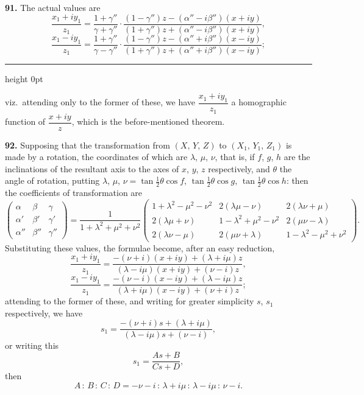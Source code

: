 \documentclass[11pt,a4paper]{article}
\newcommand{\artno}[1]{\textbf{#1.}\quad}
\begin{document}
\artno{91} The actual values are
\[
  \frac{x_{1} + i y_{1}}{z_{1}}
   = \frac{1 + \gamma''}{\gamma + \gamma''}\cdot
     \frac{(1 - \gamma'')z - (\alpha'' - i\beta'')(x + iy)}
          {(1 + \gamma'')z + (\alpha'' - i\beta'')(x + iy)},
\]
\[
  \frac{x_{1} - i y_{1}}{z_{1}}
   = \frac{1 + \gamma''}{\gamma - \gamma''}\cdot
     \frac{(1 - \gamma'')z - (\alpha'' + i\beta'')(x - iy)}
          {(1 + \gamma'')z + (\alpha'' + i\beta'')(x - iy)};
\]

\bigskip
\hrule height 0pt
\bigskip

\noindent
viz.\ attending only to the former of these, we have
$\dfrac{x_{1} + iy_{1}}{z_{1}}$ a homographic function of $\dfrac{x + iy}{z}$,
which is the before-mentioned theorem.

\artno{92} Supposing that the transformation from $(X,\,Y,\,Z)$ to
$(X_{1},\,Y_{1},\,Z_{1})$ is made by a rotation, the coordinates of which are
$\lambda$, $\mu$, $\nu$, that is, if $f$, $g$, $h$ are the inclinations of
the resultant axis to the axes of $x$, $y$, $z$ respectively, and $\theta$
the angle of rotation, putting $\lambda$, $\mu$, $\nu = \tan\tfrac{1}{2}\theta\cos f$,
$\tan\tfrac{1}{2}\theta\cos g$, $\tan\tfrac{1}{2}\theta\cos h$: then the
coefficients of transformation are
\[
  \begin{pmatrix} \alpha & \beta & \gamma\\
    \alpha' & \beta' & \gamma'\\
    \alpha'' & \beta'' & \gamma''
  \end{pmatrix}
  = \frac{1}{1 + \lambda^{2} + \mu^{2} + \nu^{2}}
    \begin{pmatrix}
      1 + \lambda^{2} - \mu^{2} - \nu^{2} & 2(\lambda\mu - \nu) & 2(\lambda\nu + \mu)\\
      2(\lambda\mu + \nu) & 1 - \lambda^{2} + \mu^{2} - \nu^{2} & 2(\mu\nu - \lambda)\\
      2(\lambda\nu - \mu) & 2(\mu\nu + \lambda) & 1 - \lambda^{2} - \mu^{2} + \nu^{2}
    \end{pmatrix}.
\]
Substituting these values, the formulae become, after an easy reduction,
\[
  \frac{x_{1} + i y_{1}}{z_{1}}
   = \frac{-(\nu + i)(x + iy) + (\lambda + i\mu)z}{(\lambda - i\mu)(x + iy) + (\nu - i)z},
\]
\[
  \frac{x_{1} - i y_{1}}{z_{1}}
   = \frac{-(\nu - i)(x - iy) + (\lambda - i\mu)z}{(\lambda + i\mu)(x - iy) + (\nu + i)z};
\]
attending to the former of these, and writing for greater simplicity $s$,
$s_{1}$ respectively, we have
\[
  s_{1} = \frac{-(\nu + i)s + (\lambda + i\mu)}{(\lambda - i\mu)s + (\nu - i)},
\]
or writing this
\[
  s_{1} = \frac{A s + B}{C s + D},
\]
then
\[
  A\,:\,B\,:\,C\,:\,D = -\nu - i\,:\,\lambda + i\mu\,:\,\lambda - i\mu\,:\,\nu - i.
\]
\end{document}
